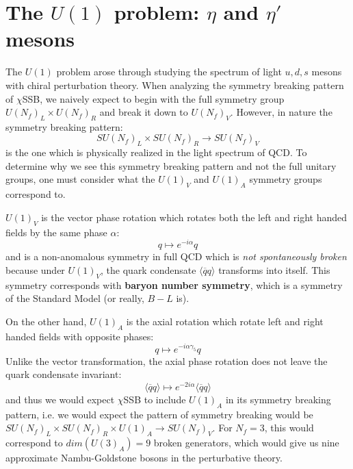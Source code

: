 \documentclass[11pt, oneside]{article}   	%
\theoremstyle{definition}
\begin{document}
\section{The $U(1)$ problem: $\eta$ and $\eta'$ mesons}

The $U(1)$ problem arose through studying the spectrum of light $u, d, s$ mesons with chiral perturbation theory. When analyzing 
the symmetry breaking pattern of $\chi$SSB, we naively expect to begin with the full symmetry group $U(N_f)_L\times U(N_f)_R$ and break 
it down to $U(N_f)_V$. However, in nature the symmetry breaking pattern:
\begin{equation}
	SU(N_f)_L\times SU(N_f)_R\rightarrow SU(N_f)_V
\end{equation}
is the one which is physically realized in the light spectrum of QCD. To determine why we see this symmetry breaking pattern and not the 
full unitary groups, one must consider what the $U(1)_V$ and $U(1)_A$ symmetry groups correspond to. 

$U(1)_V$ is the vector phase 
rotation which rotates both the left and right handed fields by the same phase $\alpha$:
\begin{equation}
	q\mapsto e^{-i\alpha} q
\end{equation}
and is a non-anomalous symmetry in full QCD which is \textit{not spontaneously broken} because under $U(1)_V$, the quark condensate 
$\langle \overline q q\rangle$ transforms into itself. This symmetry corresponds with \textbf{baryon 
number symmetry}, which is a symmetry of the Standard Model (or really, $B - L$ is). 

On the other hand, $U(1)_A$ is the axial rotation which rotate left and right handed fields with opposite phases:
\begin{equation}
	q\mapsto e^{-i\alpha\gamma_5} q
\end{equation}
Unlike the vector transformation, the axial phase rotation does not leave the quark condensate invariant:
\begin{equation}
	\langle \overline q q\rangle \mapsto e^{-2i\alpha} \langle\overline q q\rangle
\end{equation}
and thus we would expect $\chi$SSB to include $U(1)_A$ in its symmetry breaking pattern, i.e. we would expect the pattern of 
symmetry breaking would be $SU(N_f)_L\times SU(N_f)_R\times U(1)_A\rightarrow SU(N_f)_V$. For $N_f = 3$, this would correspond to 
$dim(U(3)_A) = 9$ broken generators, which would give us nine approximate Nambu-Goldstone bosons in the perturbative theory. 
\end{document}
